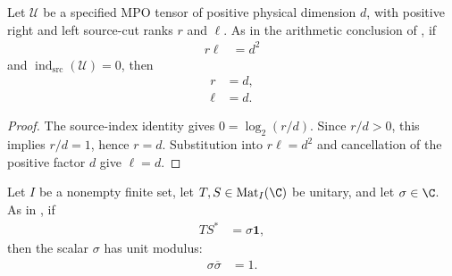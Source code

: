 \begin{lemma}
    \label{thm:mpug_zero_specified_source_index_ranks}
    \leanok
    Let $\mathcal U$ be a specified MPO tensor of positive physical dimension
    $d$, with positive right and left source-cut ranks $r$ and $\ell$. As in
    the arithmetic conclusion of \cite[line~1547]{FrancoRubio2025MPUGauging},
    if
    \begin{align}
        r\ell & =d^2
    \end{align}
    and $\operatorname{ind}_{\mathrm{src}}(\mathcal U)=0$, then
    \begin{align}
        r    & =d, \\
        \ell & =d.
    \end{align}
\end{lemma}

\begin{proof}\leanok
    The source-index identity gives
    $0=\log_2(r/d)$. Since $r/d>0$, this implies $r/d=1$, hence $r=d$.
    Substitution into $r\ell=d^2$ and cancellation of the positive factor $d$
    give $\ell=d$.
\end{proof}

\begin{lemma}
    \label{thm:mpug_unitary_entrywise_scalar_phase}
    \leanok
    Let $I$ be a nonempty finite set, let $T,S\in\operatorname{Mat}_I(\C)$ be
    unitary, and let $\sigma\in\C$. As in
    \cite[lines~1557--1562]{FrancoRubio2025MPUGauging}, if
    \begin{align}
        TS^* & =\sigma\mathbf 1,
        \label{eq:mpug_unitary_entrywise_scalar_relation}
    \end{align}
    then the scalar $\sigma$ has unit modulus:
    \begin{align}
        \sigma\overline\sigma & =1.
        \label{eq:mpug_unitary_entrywise_scalar_phase}
    \end{align}
\end{lemma}

